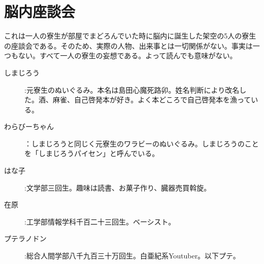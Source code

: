 \section{脳内座談会}
これは一人の寮生が部屋でまどろんでいた時に脳内に誕生した架空の5人の寮生の座談会である。そのため、実際の人物、出来事とは一切関係がない。事実は一つもない。すべて一人の寮生の妄想である。よって読んでも意味がない。

\begin{description}
\item[しまじろう]:元寮生のぬいぐるみ。本名は島田心魔死路卯。姓名判断により改名した。酒、麻雀、自己啓発本が好き。よく本どころで自己啓発本を漁っている。

\item[わらびーちゃん]：しまじろうと同じく元寮生のワラビーのぬいぐるみ。しまじろうのことを「しまじろうパイセン」と呼んでいる。

\item[はな子]:文学部三回生。趣味は読書、お菓子作り、臓器売買斡旋。

\item[在原]:工学部情報学科千百二十三回生。ベーシスト。

\item[プテラノドン]:総合人間学部八千九百三十万回生。白亜紀系Youtuber。以下プテ。
\end{description}


